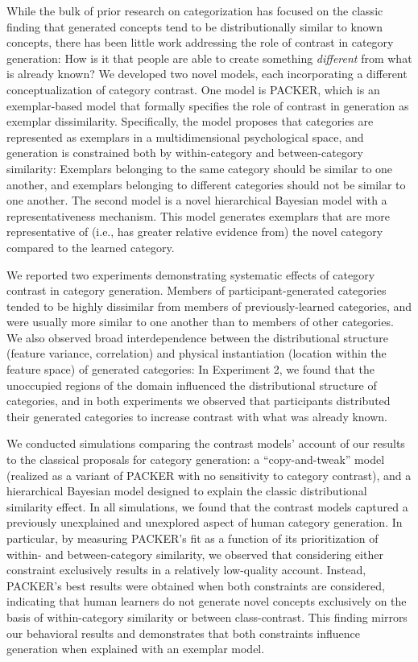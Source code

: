 \documentclass[pdflatex,sn-apa]{sn-jnl}%
\theoremstyle{thmstyleone}%
\theoremstyle{thmstyletwo}%
\theoremstyle{thmstylethree}%
\begin{document}
While the bulk of prior research on categorization has focused on the classic
finding that generated concepts tend to be distributionally similar to known
concepts, there has been little work addressing the role of contrast in category
generation: How is it that people are able to create something {\em different}
from what is already known? We developed two novel models, each incorporating a
different conceptualization of category contrast. One model is PACKER, which is
an exemplar-based model that formally specifies the role of contrast in
generation as exemplar dissimilarity. Specifically, the model proposes that
categories are represented as exemplars in a multidimensional psychological
space, and generation is constrained both by within-category and
between-category similarity: Exemplars belonging to the same category should be
similar to one another, and exemplars belonging to different categories should
not be similar to one another. The second model is a novel hierarchical Bayesian
model with a representativeness mechanism. This model generates exemplars that
are more representative of (i.e., has greater relative evidence from) the novel
category compared to the learned category.

We reported two experiments demonstrating systematic effects of category
contrast in category generation. Members of participant-generated categories
tended to be highly dissimilar from members of previously-learned categories,
and were usually more similar to one another than to members of other
categories. We also observed broad interdependence between the distributional
structure (feature variance, correlation) and physical instantiation (location
within the feature space) of generated categories: In Experiment 2, we found
that the unoccupied regions of the domain influenced the distributional
structure of categories, and in both experiments we observed that participants
distributed their generated categories to increase contrast with what was
already known.

We conducted simulations comparing the contrast models' account of our results
to the classical proposals for category generation: a ``copy-and-tweak'' model
(realized as a variant of PACKER with no sensitivity to category contrast), and
a hierarchical Bayesian model designed to explain the classic distributional
similarity effect. In all simulations, we found that the contrast models
captured a previously unexplained and unexplored aspect of human category
generation. In particular, by measuring PACKER's fit as a function of its
prioritization of within- and between-category similarity, we observed that
considering either constraint exclusively results in a relatively low-quality
account. Instead, PACKER's best results were obtained when both constraints are
considered, indicating that human learners do not generate novel concepts
exclusively on the basis of within-category similarity or between
class-contrast. This finding mirrors our behavioral results and demonstrates
that both constraints influence generation when explained with an exemplar
model. 
\end{document}
